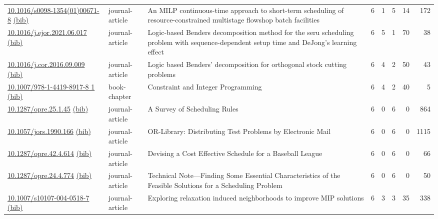 {\begin{longtable}{p{5cm}lp{11cm}rrrrr}
\href{http://dx.doi.org/10.1016/s0098-1354(01)00671-8}{10.1016/s0098-1354(01)00671-8} \href{https://www.doi2bib.org/bib/10.1016/s0098-1354(01)00671-8}{(bib)} & journal-article & An MILP continuous-time approach to short-term scheduling of resource-constrained multistage flowshop batch facilities & 6 & 1 & 5 & 14 & 172 \\
\href{http://dx.doi.org/10.1016/j.ejor.2021.06.017}{10.1016/j.ejor.2021.06.017} \href{https://www.doi2bib.org/bib/10.1016/j.ejor.2021.06.017}{(bib)} & journal-article & Logic-based Benders decomposition method for the seru scheduling problem with sequence-dependent setup time and DeJong's learning effect & 6 & 5 & 1 & 70 & 38 \\
\href{http://dx.doi.org/10.1016/j.cor.2016.09.009}{10.1016/j.cor.2016.09.009} \href{https://www.doi2bib.org/bib/10.1016/j.cor.2016.09.009}{(bib)} & journal-article & Logic based Benders' decomposition for orthogonal stock cutting problems & 6 & 4 & 2 & 50 & 43 \\
\href{http://dx.doi.org/10.1007/978-1-4419-8917-8_1}{10.1007/978-1-4419-8917-8 1} \href{https://www.doi2bib.org/bib/10.1007/978-1-4419-8917-8_1}{(bib)} & book-chapter & Constraint and Integer Programming & 6 & 4 & 2 & 40 & 5 \\
\href{http://dx.doi.org/10.1287/opre.25.1.45}{10.1287/opre.25.1.45} \href{https://www.doi2bib.org/bib/10.1287/opre.25.1.45}{(bib)} & journal-article & A Survey of Scheduling Rules & 6 & 0 & 6 & 0 & 864 \\
\href{http://dx.doi.org/10.1057/jors.1990.166}{10.1057/jors.1990.166} \href{https://www.doi2bib.org/bib/10.1057/jors.1990.166}{(bib)} & journal-article & OR-Library: Distributing Test Problems by Electronic Mail & 6 & 0 & 6 & 0 & 1115 \\
\href{http://dx.doi.org/10.1287/opre.42.4.614}{10.1287/opre.42.4.614} \href{https://www.doi2bib.org/bib/10.1287/opre.42.4.614}{(bib)} & journal-article & Devising a Cost Effective Schedule for a Baseball League & 6 & 0 & 6 & 0 & 66 \\
\href{http://dx.doi.org/10.1287/opre.24.4.774}{10.1287/opre.24.4.774} \href{https://www.doi2bib.org/bib/10.1287/opre.24.4.774}{(bib)} & journal-article & Technical Note—Finding Some Essential Characteristics of the Feasible Solutions for a Scheduling Problem & 6 & 0 & 6 & 0 & 50 \\
\href{http://dx.doi.org/10.1007/s10107-004-0518-7}{10.1007/s10107-004-0518-7} \href{https://www.doi2bib.org/bib/10.1007/s10107-004-0518-7}{(bib)} & journal-article & Exploring relaxation induced neighborhoods to improve MIP solutions & 6 & 3 & 3 & 35 & 338 \\

\end{longtable}}
